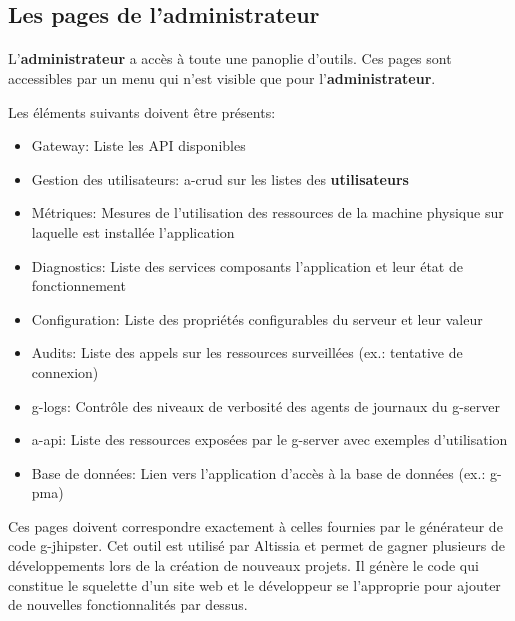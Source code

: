 \subsection{Les pages de l'administrateur}
\label{subsec:admin-pages}

\paragraph{}
L'\textbf{administrateur} a accès à toute une panoplie d'outils.
Ces pages sont accessibles par un menu qui n'est visible que pour l'\textbf{administrateur}.

Les éléments suivants doivent être présents:
\begin{itemize}
    \item Gateway: Liste les API disponibles
    \item Gestion des utilisateurs: \acrshort{a-crud} sur les listes des \textbf{utilisateurs}
    \item Métriques: Mesures de l'utilisation des ressources de la machine physique sur laquelle est installée l'application
    \item Diagnostics: Liste des services composants l'application et leur état de fonctionnement
    \item Configuration: Liste des propriétés configurables du serveur et leur valeur
    \item Audits: Liste des appels sur les ressources surveillées (ex.: tentative de connexion)
    \item \Glspl{g-log}: Contrôle des niveaux de verbosité des agents de journaux du \gls{g-server}
    \item \gls{a-api}: Liste des ressources exposées par le \gls{g-server} avec exemples d'utilisation
    \item Base de données: Lien vers l'application d'accès à la base de données (ex.: \gls{g-pma})
\end{itemize}

Ces pages doivent correspondre exactement à celles fournies par le générateur de code \Gls{g-jhipster}.
Cet outil est utilisé par Altissia et permet de gagner plusieurs de développements lors de la création de nouveaux projets.
Il génère le code qui constitue le squelette d'un site web et le développeur se l'approprie pour ajouter de nouvelles fonctionnalités par dessus.
